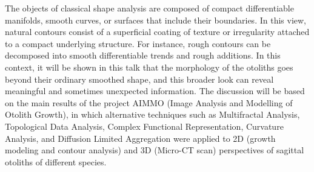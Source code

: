 \documentclass[a4paper]{article}
\begin{document}
The objects of classical shape analysis are composed of compact differentiable manifolds, smooth curves, or surfaces that include their boundaries. In this view, natural contours consist of a superficial coating of texture or irregularity attached to a compact underlying structure. For instance, rough contours can be decomposed into smooth differentiable trends and rough additions. In this context, it will be shown in this talk that the morphology of the otoliths goes beyond their ordinary smoothed shape, and this broader look can reveal meaningful and sometimes unexpected information. The discussion will be based on the main results of the project AIMMO (Image Analysis and Modelling of Otolith Growth), in which alternative techniques such as Multifractal Analysis, Topological Data Analysis, Complex Functional Representation, Curvature Analysis, and Diffusion Limited Aggregation were applied to 2D (growth modeling and contour analysis) and 3D (Micro-CT scan) perspectives of sagittal otoliths of different species.
\end{document}

